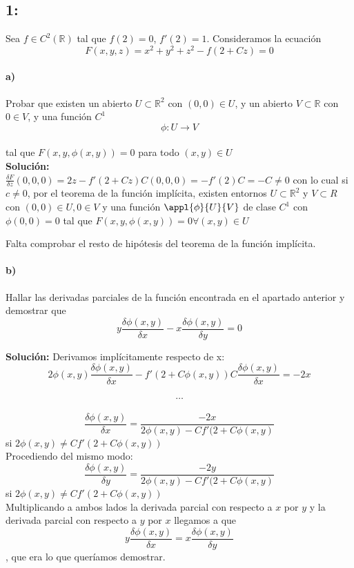 \subsection{1:}

Sea $f\in C^2(\mathbb{R})$ tal que $f(2) = 0$, $f'(2)=1$. Consideramos la ecuación \\$$F(x,y,z) = x^2+y^2+z^2-f(2+Cz)=0$$

\paragraph{a)} Probar que existen un abierto $U\subset \mathbb{R}^2$ con $(0,0)\in U$, y un abierto $V\subset \mathbb{R}$ con $0\in V$, y una función $C^1$\\$$\phi: U \rightarrow V$$\\tal que $F(x, y, \phi (x, y)) = 0$ para todo $(x,y) \in U$\\

\textbf{Solución:}\\
$\frac{\delta F}{\delta z}(0,0,0) = 2z - f'(2+Cz)C (0,0,0) =-f'(2)C = -C \neq 0$
con lo cual si $c\neq 0$, por el teorema de la función implícita, existen entornos $U\subset \mathbb{R}^2$ y $V\subset{R}$ con $(0,0)\in U, 0\in V$ y una función $\appl{\phi}{U}{V}$ de clase $C^1$ con $\phi (0,0) = 0$ tal que $F(x,y,\phi (x,y)) = 0 \forall (x,y)\in U$

Falta comprobar el resto de hipótesis del teorema de la función implícita.

\paragraph{b)} Hallar las derivadas parciales de la función encontrada en el apartado anterior y demostrar que \\

$$y\frac{\delta \phi (x,y)}{\delta x} - x\frac{\delta \phi (x,y)}{\delta y} = 0$$

\textbf{Solución:}
Derivamos implícitamente respecto de x:\\
$$2\phi (x,y) \frac{\delta \phi (x,y)}{\delta x} - f'(2+C\phi (x,y))C\frac{\delta \phi (x,y)}{\delta x}=-2x$$\\
$$\hdots$$\\
$$\frac{\delta \phi (x,y)}{\delta x} = \frac{-2x}{2\phi (x,y) - Cf'(2+C\phi (x,y)}$$ si $2\phi (x,y) \neq Cf'(2+C\phi (x,y))$
\\Procediendo del mismo modo: \\
$$\frac{\delta \phi (x,y)}{\delta y} = \frac{-2y}{2\phi (x,y) - Cf'(2+C\phi (x,y)}$$ si $2\phi (x,y) \neq Cf'(2+C\phi (x,y))$\\
Multiplicando a ambos lados la derivada parcial con respecto a $x$ por $y$ y la derivada parcial con respecto a $y$ por $x$ llegamos a que\\ $$y\frac{\delta \phi (x,y)}{\delta x} = x\frac{\delta \phi (x,y)}{\delta y}$$, que era lo que queríamos demostrar.


